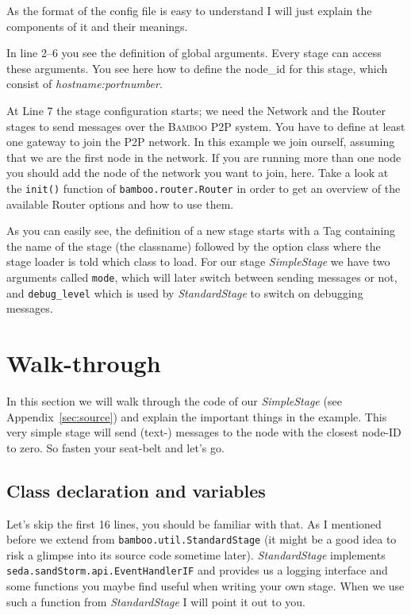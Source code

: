 \documentclass[twocolumn, twoside, a4paper]{article}
\begin{document}
As the format of the config file is easy to understand I will just
explain the components of it and their meanings.

In line 2--6 you see the definition of global arguments. Every stage can
access these arguments. You see here how to define the node\_id for
this stage, which consist of \emph{hostname:portnumber}. 

At Line 7 the stage configuration starts; we need the Network and the
Router stages to send messages over the \textsc{Bamboo} P2P system. You have to
define at least one gateway to join the P2P network. In this example we
join ourself, assuming that we are the first node in the network. If
you are running more than one node you should add the node of the
network you want to join, here. Take a look at the \texttt{init()} function
of \texttt{bamboo.router.Router} in order to get an overview of the
available Router options and how to use them. 

As you can easily see, the definition of a new stage starts with a Tag
containing the name of the stage (the classname) followed by the option
class where the stage loader is told which class to load.
For our stage \emph{SimpleStage} we have two arguments called
\texttt{mode}, which will later switch between sending messages or not,
and \texttt{debug\_level} which is used by \emph{StandardStage} to
switch on debugging messages.

\section{Walk-through}
\label{sec:walkthrough}

In this section we will walk through the code of our
\emph{SimpleStage} (see Appendix~\ref{sec:source}) and explain the
important things in the example. This very simple stage will
send (text-) messages to the node with the closest node-ID to zero. So
fasten your seat-belt and let's go.

\subsection{Class declaration and variables}
\label{sec:head}

Let's skip the first 16 lines, you should be familiar with that. As I
mentioned before we extend from \texttt{bamboo.util.StandardStage} (it
might be a good idea to risk a glimpse into its source code sometime
later). \emph{StandardStage} implements
\texttt{seda.sandStorm.api.EventHandlerIF} and provides us a logging
interface and some functions you maybe find useful when writing your
own stage. When we use such a function from \emph{StandardStage} I
will point it out to you.
\end{document}
